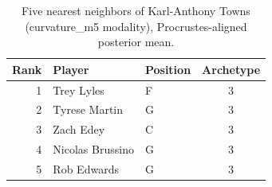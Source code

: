 \begin{table}[htbp]
  \centering\small
  \begin{tabular}{rllc}
    \toprule
    Rank & Player & Position & Archetype \\
    \midrule
    1 & Trey Lyles & F & 3 \\
    2 & Tyrese Martin & G & 3 \\
    3 & Zach Edey & C & 3 \\
    4 & Nicolas Brussino & G & 3 \\
    5 & Rob Edwards & G & 3 \\
    \bottomrule
  \end{tabular}
  \caption{Five nearest neighbors of Karl-Anthony Towns (curvature_m5 modality), Procrustes-aligned posterior mean.}
  \label{tab:Karl_Anthony_Towns_neighbors_curvature_m5}
\end{table}

